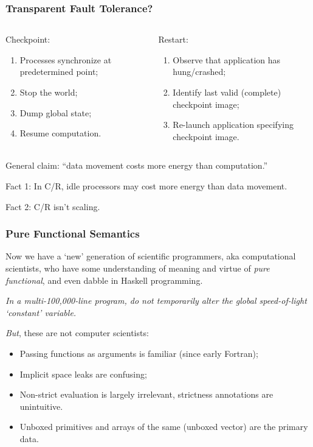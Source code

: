 \documentclass{beamer}
\begin{document}
\begin{frame}
  \frametitle{Transparent Fault Tolerance?}
  \begin{columns}[t]
    \begin{column}{.48\linewidth}
      Checkpoint:
      \begin{enumerate}
      \item Processes synchronize at predetermined point;
      \item Stop the world;
      \item Dump global state;
      \item Resume computation.
      \end{enumerate}
    \end{column}
    \begin{column}[T]{.48\linewidth}
      Restart:
      \begin{enumerate}
      \item Observe that application has hung/crashed;
      \item Identify last valid (complete) checkpoint image;
      \item Re-launch application specifying checkpoint image.
      \end{enumerate}
    \end{column}
  \end{columns}
\vspace{0.1in}
General claim:  ``data movement costs more energy than computation.''

Fact 1: In C/R, idle processors may cost more energy than data movement.

Fact 2:  C/R isn't scaling.
\end{frame}


\begin{frame}
\frametitle{Pure Functional Semantics}
Now we have a `new' generation of scientific programmers, aka computational scientists, who
have some understanding of meaning and virtue of \emph{pure functional}, and even dabble
in Haskell programming.
\vspace{0.1in}

\emph{In a multi-100,000-line program, do not temporarily alter the global speed-of-light
`constant' variable.}
\vspace{0.1in}

\emph{But}, these are not computer scientists:  
\begin{itemize}
\item Passing functions as arguments is familiar (since early Fortran);
\item Implicit space leaks are confusing;
\item Non-strict evaluation is largely irrelevant, strictness annotations are unintuitive.
\item Unboxed primitives and arrays of the same (unboxed vector) are the primary data.
\end{itemize}
\end{frame}
\end{document}
